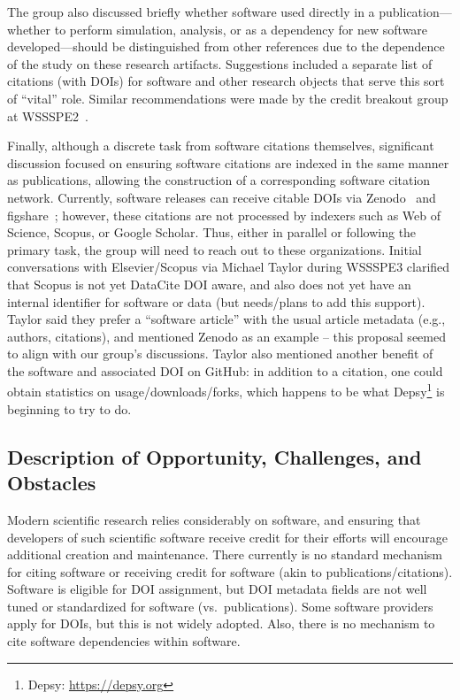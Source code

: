 The group also discussed briefly whether software used directly in a
publication---whether to perform simulation, analysis, or as a dependency for
new software developed---should be distinguished from other references due to
the dependence of the study on these research artifacts. Suggestions included a
separate list of citations (with DOIs) for software and other research objects
that serve this sort of ``vital'' role. Similar recommendations were made by the
credit breakout group at WSSSPE2~\cite{WSSSPE2}.

Finally, although a discrete task from software citations themselves,
significant discussion focused on ensuring software citations are indexed in the
same manner as publications, allowing the construction of a corresponding
software citation network. Currently, software releases can receive citable DOIs
via Zenodo~\cite{zenodo-web} and figshare~\cite{figshare-web}; however, these
citations are not processed by indexers such as Web of Science, Scopus, or
Google Scholar. Thus, either in parallel or following the primary task, the
group will need to reach out to these organizations. Initial conversations with
Elsevier\slash Scopus via Michael Taylor during WSSSPE3 clarified that Scopus
is not yet DataCite DOI aware, and also does not yet have an internal identifier
for software or data (but needs\slash plans to add this support). Taylor said
they prefer a ``software article'' with the usual article metadata (e.g.,
authors, citations), and mentioned Zenodo as an example -- this proposal seemed
to align with our group's discussions. Taylor also mentioned another benefit of the
software and associated DOI on GitHub: in addition to a citation, one could obtain
statistics on usage/downloads/forks, which happens to be what
Depsy\footnote{Depsy: \url{https://depsy.org}} is beginning to try to do.

\subsection{Description of Opportunity, Challenges, and Obstacles}

Modern scientific research relies considerably on software, and ensuring that
developers of such scientific software receive credit for their efforts will
encourage additional creation and maintenance.  There currently is no standard mechanism for citing software or
receiving credit for software (akin to publications/citations). Software is
eligible for DOI assignment, but DOI metadata fields are not well tuned or
standardized for software (vs.\ publications). Some software providers apply for
DOIs, but this is not widely adopted. Also, there is no mechanism to cite
software dependencies within software.

